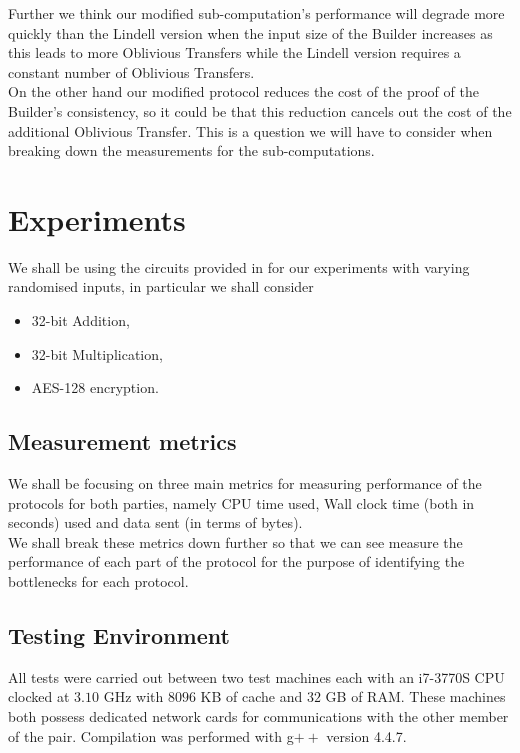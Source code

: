 \documentclass[ %
                    author={Nicholas Tutte},
                supervisor={Prof. Nigel Smart},
                    degree={MEng},
                     title={Secure Two Party Computation},
                  subtitle={A practical comparison of recent protocols},
                      type={Research - GG1K},
                      year={2015} ]{dissertation}
\begin{document}
				Further we think our modified sub-computation's performance will degrade more quickly than the Lindell version when the input size of the Builder increases as this leads to more Oblivious Transfers while the Lindell version requires a constant number of Oblivious Transfers.\\

				On the other hand our modified protocol reduces the cost of the proof of the Builder's consistency, so it could be that this reduction cancels out the cost of the additional Oblivious Transfer. This is a question we will have to consider when breaking down the measurements for the sub-computations.

	\chapter{Experiments} \label{sec:Results}
		We shall be using the circuits provided in \cite{NigelCircuits} for our experiments with varying randomised inputs, in particular we shall consider
		
		\begin{itemize}
			\setlength\itemsep{0.2em}
			\item 32-bit Addition,
			\item 32-bit Multiplication,
			\item AES-128 encryption.
		\end{itemize} \vspace{-0.9cm}

		\section{Measurement metrics}
			We shall be focusing on three main metrics for measuring performance of the protocols for both parties, namely CPU time used, Wall clock time (both in seconds) used and data sent (in terms of bytes).\\

			We shall break these metrics down further so that we can see measure the performance of each part of the protocol for the purpose of identifying the bottlenecks for each protocol.

		\section{Testing Environment}
			All tests were carried out between two test machines each with an i7-3770S CPU clocked at $3.10$ GHz with $8096$ KB of cache and $32$ GB of RAM. These machines both possess dedicated network cards for communications with the other member of the pair. Compilation was performed with g$++$ version 4.4.7. 
\end{document}
